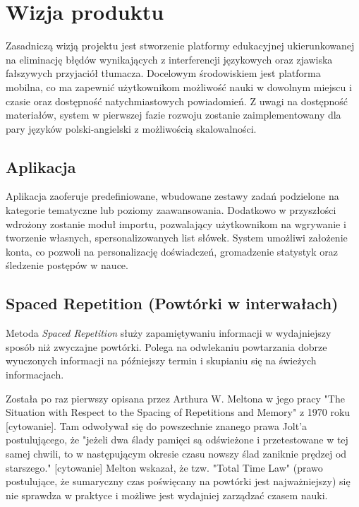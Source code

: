 \documentclass[polish]{aghengthesis}
\begin{document}

\section{Wizja produktu}
Zasadniczą wizją projektu jest stworzenie platformy edukacyjnej ukierunkowanej
na eliminację błędów wynikających z interferencji językowych oraz zjawiska
fałszywych przyjaciół tłumacza. Docelowym środowiskiem jest platforma mobilna,
co ma zapewnić użytkownikom możliwość nauki w dowolnym miejscu i czasie oraz
dostępność natychmiastowych powiadomień. Z uwagi na dostępność materiałów, system
w pierwszej fazie rozwoju zostanie zaimplementowany dla pary języków
polski-angielski z możliwością skalowalności.

\subsection{Aplikacja}
Aplikacja zaoferuje predefiniowane, wbudowane zestawy zadań podzielone na
kategorie tematyczne lub poziomy zaawansowania. Dodatkowo w przyszłości wdrożony
zostanie moduł importu, pozwalający użytkownikom na wgrywanie i tworzenie
własnych, spersonalizowanych list słówek. System umożliwi założenie konta, co
pozwoli na personalizację doświadczeń, gromadzenie statystyk oraz śledzenie
postępów w nauce.

\subsection{Spaced Repetition (Powtórki w interwałach)}

Metoda \emph{Spaced Repetition} służy zapamiętywaniu informacji w wydajniejszy
sposób niż zwyczajne powtórki. Polega na odwlekaniu powtarzania dobrze wyuczonych
informacji na późniejszy termin i skupianiu się na świeżych informacjach.

Została po raz pierwszy opisana przez Arthura W. Meltona w jego pracy "The
Situation with Respect to the Spacing of Repetitions and Memory" z 1970
roku [cytowanie]. Tam odwoływał się do powszechnie znanego prawa
Jolt'a postulującego, że "jeżeli dwa ślady pamięci są odświeżone i przetestowane
w tej samej chwili, to w następującym okresie czasu nowszy ślad zaniknie prędzej
od starszego." [cytowanie] Melton wskazał, że tzw. "Total Time Law" (prawo
postulujące, że sumaryczny czas poświęcany na powtórki jest najważniejszy) się nie
sprawdza w praktyce i możliwe jest wydajniej zarządzać czasem nauki.
\end{document}

